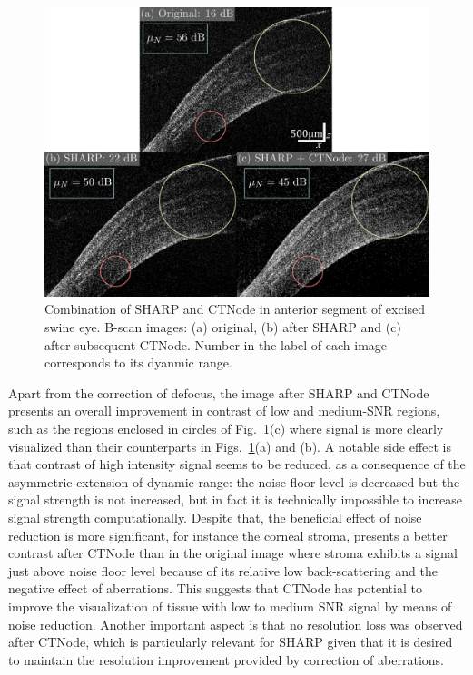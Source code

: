 \begin{figure}[htb!]
	\centering
	\includegraphics[width=\textwidth]{Figures/Results/ASImaging-CTNode.pdf}
	\caption[Combination of SHARP and CTNode in anterior segment of excised swine eye.]{Combination of SHARP and CTNode in anterior segment of excised swine eye. B-scan images: (a) original, (b) after SHARP and (c) after subsequent CTNode. Number in the label of each image corresponds to its dyanmic range.}
	\label{fig:ASImaging_CTNode}
\end{figure}

\FloatBarrier

Apart from the correction of defocus, the image after SHARP and CTNode presents an overall improvement in contrast of low and medium-SNR regions, such as the regions enclosed in circles of Fig.~\ref{fig:ASImaging_CTNode}(c) where signal is more clearly visualized than their counterparts in Figs.~\ref{fig:ASImaging_CTNode}(a) and (b). A notable side effect is that contrast of high intensity signal seems to be reduced, as a consequence of the asymmetric extension of dynamic range: the noise floor level is decreased but the signal strength is not increased, but in fact it is technically impossible to increase signal strength computationally. Despite that, the beneficial effect of noise reduction is more significant, for instance the corneal stroma, presents a better contrast after CTNode than in the original image where stroma exhibits a signal just above noise floor level because of its relative low back-scattering and the negative effect of aberrations. This suggests that CTNode has potential to improve the visualization of tissue with low to medium SNR signal by means of noise reduction. Another important aspect is that no resolution loss was observed after CTNode, which is particularly relevant for SHARP given that it is desired to maintain the resolution improvement provided by correction of aberrations.


